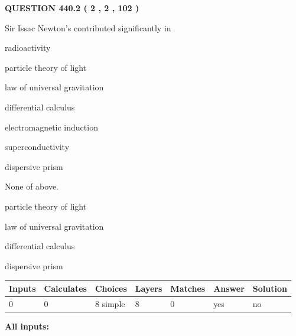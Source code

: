 \documentclass[12pt]{article}
\begin{document}
\vspace{0.2in}
  
{\textbf{\Large{QUESTION
440.2 
 ( 2 , 2 , 102 )
}}}
  
  
Sir Issac Newton's contributed significantly in
 
 
radioactivity
 
 
particle theory of light
 
 
law of universal gravitation
 
 
differential calculus
 
 
electromagnetic induction
 
 
superconductivity
 
 
dispersive prism
 
 
 None of above.
 
 
\noindent{}
 
 
particle theory of light
 
 
law of universal gravitation
 
 
differential calculus
 
 
dispersive prism
 
 
\noindent{}
 
 
   
   
   
   
\noindent\begin{tabular}{|l|l|l|l|l|l|l|}
 \hline
Inputs & Calculates & Choices & Layers & Matches & Answer & Solution \\ \hline
 0  & 
 0  & 
 8
  simple  
  & 
 8  & 
 0  & 
  yes & 
  no 
  \\ \hline
 \end{tabular}
   
   
   
   
\noindent{}
   
   
   
   
\noindent\vspace{0.1in}\hspace{-0.08in} {\textbf{\Large{All inputs: }}}
   
\end{document}
